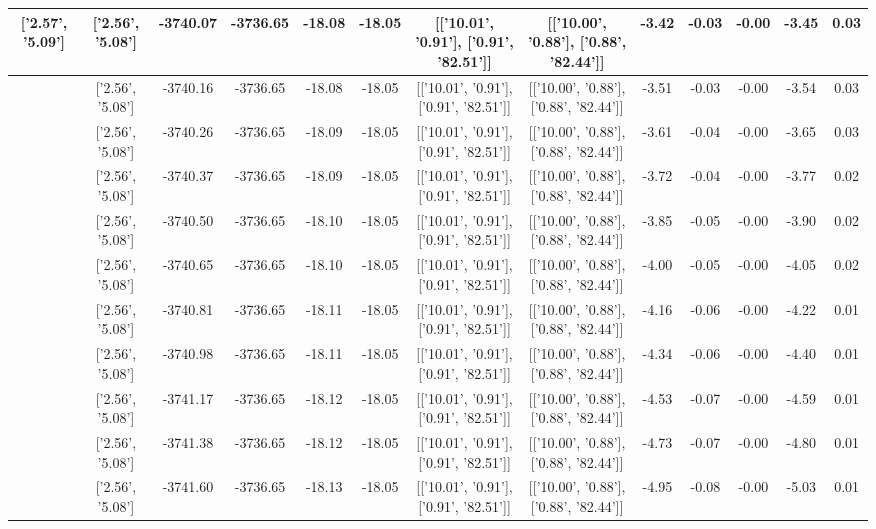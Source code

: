 \begin{table}[htbp]
\begin{adjustbox}{angle=90}
\begin{tabular}{|c|c|c|c|c|c|c|c|c|c|c|c|c|}
 ['2.57', '5.09'] & ['2.56', '5.08'] & -3740.07 & -3736.65 & -18.08 & -18.05 & [['10.01', '0.91'], ['0.91', '82.51']] & [['10.00', '0.88'], ['0.88', '82.44']] & -3.42 & -0.03 & -0.00 & -3.45 & 0.03\\ \hline
 ['2.57', '5.09'] & ['2.56', '5.08'] & -3740.16 & -3736.65 & -18.08 & -18.05 & [['10.01', '0.91'], ['0.91', '82.51']] & [['10.00', '0.88'], ['0.88', '82.44']] & -3.51 & -0.03 & -0.00 & -3.54 & 0.03\\ \hline
 ['2.57', '5.09'] & ['2.56', '5.08'] & -3740.26 & -3736.65 & -18.09 & -18.05 & [['10.01', '0.91'], ['0.91', '82.51']] & [['10.00', '0.88'], ['0.88', '82.44']] & -3.61 & -0.04 & -0.00 & -3.65 & 0.03\\ \hline
 ['2.57', '5.09'] & ['2.56', '5.08'] & -3740.37 & -3736.65 & -18.09 & -18.05 & [['10.01', '0.91'], ['0.91', '82.51']] & [['10.00', '0.88'], ['0.88', '82.44']] & -3.72 & -0.04 & -0.00 & -3.77 & 0.02\\ \hline
 ['2.57', '5.09'] & ['2.56', '5.08'] & -3740.50 & -3736.65 & -18.10 & -18.05 & [['10.01', '0.91'], ['0.91', '82.51']] & [['10.00', '0.88'], ['0.88', '82.44']] & -3.85 & -0.05 & -0.00 & -3.90 & 0.02\\ \hline
 ['2.58', '5.09'] & ['2.56', '5.08'] & -3740.65 & -3736.65 & -18.10 & -18.05 & [['10.01', '0.91'], ['0.91', '82.51']] & [['10.00', '0.88'], ['0.88', '82.44']] & -4.00 & -0.05 & -0.00 & -4.05 & 0.02\\ \hline
 ['2.58', '5.09'] & ['2.56', '5.08'] & -3740.81 & -3736.65 & -18.11 & -18.05 & [['10.01', '0.91'], ['0.91', '82.51']] & [['10.00', '0.88'], ['0.88', '82.44']] & -4.16 & -0.06 & -0.00 & -4.22 & 0.01\\ \hline
 ['2.58', '5.09'] & ['2.56', '5.08'] & -3740.98 & -3736.65 & -18.11 & -18.05 & [['10.01', '0.91'], ['0.91', '82.51']] & [['10.00', '0.88'], ['0.88', '82.44']] & -4.34 & -0.06 & -0.00 & -4.40 & 0.01\\ \hline
 ['2.58', '5.09'] & ['2.56', '5.08'] & -3741.17 & -3736.65 & -18.12 & -18.05 & [['10.01', '0.91'], ['0.91', '82.51']] & [['10.00', '0.88'], ['0.88', '82.44']] & -4.53 & -0.07 & -0.00 & -4.59 & 0.01\\ \hline
 ['2.58', '5.09'] & ['2.56', '5.08'] & -3741.38 & -3736.65 & -18.12 & -18.05 & [['10.01', '0.91'], ['0.91', '82.51']] & [['10.00', '0.88'], ['0.88', '82.44']] & -4.73 & -0.07 & -0.00 & -4.80 & 0.01\\ \hline
 ['2.58', '5.09'] & ['2.56', '5.08'] & -3741.60 & -3736.65 & -18.13 & -18.05 & [['10.01', '0.91'], ['0.91', '82.51']] & [['10.00', '0.88'], ['0.88', '82.44']] & -4.95 & -0.08 & -0.00 & -5.03 & 0.01\\ \hline

\end{tabular}
\end{adjustbox}
\end{table}
